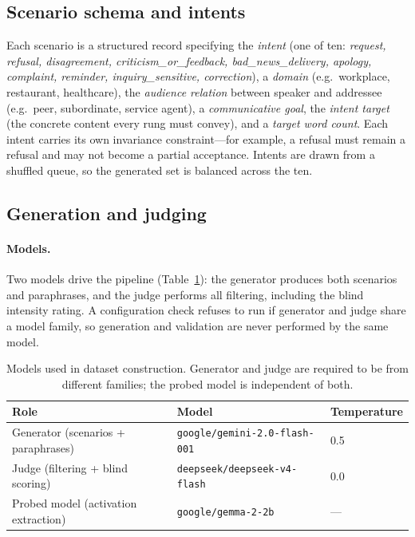 \documentclass{article}
\begin{document}
\subsection{Scenario schema and intents}

Each scenario is a structured record specifying the \emph{intent} (one of ten:
\emph{request, refusal, disagreement, criticism\_or\_feedback,
bad\_news\_delivery, apology, complaint, reminder, inquiry\_sensitive,
correction}), a \emph{domain} (e.g.\ workplace, restaurant, healthcare), the
\emph{audience relation} between speaker and addressee (e.g.\ peer, subordinate,
service agent), a \emph{communicative goal}, the \emph{intent target} (the
concrete content every rung must convey), and a \emph{target word count}. Each
intent carries its own invariance constraint---for example, a refusal must remain
a refusal and may not become a partial acceptance. Intents are drawn from a
shuffled queue, so the generated set is balanced across the ten.

\subsection{Generation and judging}

\paragraph{Models.}
Two models drive the pipeline (Table~\ref{tab:models}): the generator produces
both scenarios and paraphrases, and the judge performs all filtering, including
the blind intensity rating. A configuration check refuses to run if generator and
judge share a model family, so generation and validation are never performed by
the same model.

\begin{table}[h]
\centering
\small
\begin{tabular}{lll}
\toprule
Role & Model & Temperature \\
\midrule
Generator (scenarios + paraphrases) & \texttt{google/gemini-2.0-flash-001} & 0.5 \\
Judge (filtering + blind scoring) & \texttt{deepseek/deepseek-v4-flash} & 0.0 \\
Probed model (activation extraction) & \texttt{google/gemma-2-2b} & --- \\
\bottomrule
\end{tabular}
\caption{Models used in dataset construction. Generator and judge are required to
be from different families; the probed model is independent of both.}
\label{tab:models}
\end{table}
\end{document}
